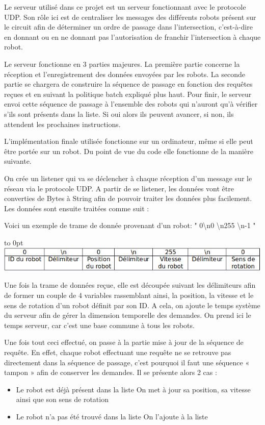 \documentclass[french,a4paper,12pt]{report}
\begin{document}
Le serveur utilisé dans ce projet est un serveur fonctionnant avec le protocole UDP. Son rôle ici est de centraliser les messages des différents robots présent sur le circuit afin de déterminer un ordre de passage dans l’intersection, c’est-à-dire en donnant ou en ne donnant pas l’autorisation de franchir l’intersection à chaque robot.

Le serveur fonctionne en 3 parties majeures. La première partie concerne la réception et l’enregistrement des données envoyées par les robots. La seconde partie se chargera de construire la séquence de passage en fonction des requêtes reçues et en suivant la politique batch expliqué plus haut. Pour finir, le serveur envoi cette séquence de passage à l’ensemble des robots qui n’auront qu’à vérifier s’ils sont présents dans la liste. Si oui alors ils peuvent avancer, si non, ils attendent les prochaines instructions.

L’implémentation finale utilisée fonctionne sur un ordinateur, même si elle peut être portée sur un robot. Du point de vue du code elle fonctionne de la manière suivante.

On crée un listener qui va se déclencher à chaque réception d’un message sur le réseau via le protocole UDP. A partir de se listener, les données vont être converties de Bytes à String afin de pouvoir traiter les données plus facilement. Les données sont ensuite traitées comme suit :

Voici un exemple de trame de donnée provenant d’un robot: " 0\textbackslash n0 \textbackslash n255 \textbackslash n-1 " \newline

\hfill\hbox to 0pt{\hss\includegraphics[width=15cm]{val.png}\hss}\hfill\null\newline

Une fois la trame de données reçue, elle est découpée suivant les délimiteurs afin de former un couple de 4 variables rassemblant ainsi, la position, la vitesse et le sens de rotation d’un robot définit par son ID. A cela, on ajoute le temps système du serveur afin de gérer la dimension temporelle des demandes. On prend ici le temps serveur, car c’est une base commune à tous les robots.

Une fois tout ceci effectué, on passe à la partie mise à jour de la séquence de requête. En effet, chaque robot effectuant une requête ne se retrouve pas directement dans la séquence de passage, c’est pourquoi il faut une séquence « tampon » afin de conserver les demandes. Il se présente alors 2 cas :
\begin{itemize}
\item Le robot est déjà présent dans la liste
	On met à jour sa position, sa vitesse ainsi que son sens de rotation
	
\item Le robot n’a pas été trouvé dans la liste
	On l’ajoute à la liste
\end{itemize}
\end{document}
